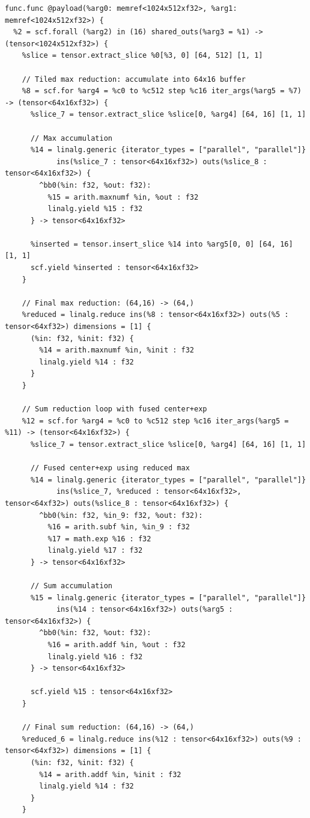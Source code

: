 \documentclass[aspectratio=169]{beamer}
\begin{document}
\begin{lstlisting}
func.func @payload(%arg0: memref<1024x512xf32>, %arg1: memref<1024x512xf32>) {
  %2 = scf.forall (%arg2) in (16) shared_outs(%arg3 = %1) -> (tensor<1024x512xf32>) {
    %slice = tensor.extract_slice %0[%3, 0] [64, 512] [1, 1]

    // Tiled max reduction: accumulate into 64x16 buffer
    %8 = scf.for %arg4 = %c0 to %c512 step %c16 iter_args(%arg5 = %7) -> (tensor<64x16xf32>) {
      %slice_7 = tensor.extract_slice %slice[0, %arg4] [64, 16] [1, 1]

      // Max accumulation
      %14 = linalg.generic {iterator_types = ["parallel", "parallel"]}
            ins(%slice_7 : tensor<64x16xf32>) outs(%slice_8 : tensor<64x16xf32>) {
        ^bb0(%in: f32, %out: f32):
          %15 = arith.maxnumf %in, %out : f32
          linalg.yield %15 : f32
      } -> tensor<64x16xf32>

      %inserted = tensor.insert_slice %14 into %arg5[0, 0] [64, 16] [1, 1]
      scf.yield %inserted : tensor<64x16xf32>
    }

    // Final max reduction: (64,16) -> (64,)
    %reduced = linalg.reduce ins(%8 : tensor<64x16xf32>) outs(%5 : tensor<64xf32>) dimensions = [1] {
      (%in: f32, %init: f32) {
        %14 = arith.maxnumf %in, %init : f32
        linalg.yield %14 : f32
      }
    }

    // Sum reduction loop with fused center+exp
    %12 = scf.for %arg4 = %c0 to %c512 step %c16 iter_args(%arg5 = %11) -> (tensor<64x16xf32>) {
      %slice_7 = tensor.extract_slice %slice[0, %arg4] [64, 16] [1, 1]

      // Fused center+exp using reduced max
      %14 = linalg.generic {iterator_types = ["parallel", "parallel"]}
            ins(%slice_7, %reduced : tensor<64x16xf32>, tensor<64xf32>) outs(%slice_8 : tensor<64x16xf32>) {
        ^bb0(%in: f32, %in_9: f32, %out: f32):
          %16 = arith.subf %in, %in_9 : f32
          %17 = math.exp %16 : f32
          linalg.yield %17 : f32
      } -> tensor<64x16xf32>

      // Sum accumulation
      %15 = linalg.generic {iterator_types = ["parallel", "parallel"]}
            ins(%14 : tensor<64x16xf32>) outs(%arg5 : tensor<64x16xf32>) {
        ^bb0(%in: f32, %out: f32):
          %16 = arith.addf %in, %out : f32
          linalg.yield %16 : f32
      } -> tensor<64x16xf32>

      scf.yield %15 : tensor<64x16xf32>
    }

    // Final sum reduction: (64,16) -> (64,)
    %reduced_6 = linalg.reduce ins(%12 : tensor<64x16xf32>) outs(%9 : tensor<64xf32>) dimensions = [1] {
      (%in: f32, %init: f32) {
        %14 = arith.addf %in, %init : f32
        linalg.yield %14 : f32
      }
    }


\end{lstlisting}
\end{document}

